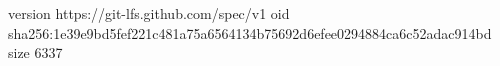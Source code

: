 version https://git-lfs.github.com/spec/v1
oid sha256:1e39e9bd5fef221c481a75a6564134b75692d6efee0294884ca6c52adac914bd
size 6337
